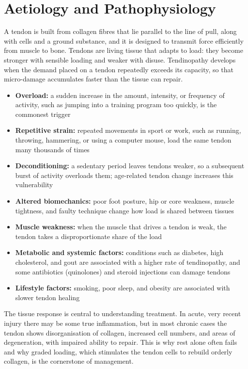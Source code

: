 \section*{Aetiology and Pathophysiology}
A tendon is built from collagen fibres that lie parallel to the line of pull, along with cells and a ground substance, and it is designed to transmit force efficiently from muscle to bone. Tendons are living tissue that adapts to load: they become stronger with sensible loading and weaker with disuse. Tendinopathy develops when the demand placed on a tendon repeatedly exceeds its capacity, so that micro-damage accumulates faster than the tissue can repair.

\begin{itemize}
    \item \textbf{Overload:} a sudden increase in the amount, intensity, or frequency of activity, such as jumping into a training program too quickly, is the commonest trigger
    \item \textbf{Repetitive strain:} repeated movements in sport or work, such as running, throwing, hammering, or using a computer mouse, load the same tendon many thousands of times
    \item \textbf{Deconditioning:} a sedentary period leaves tendons weaker, so a subsequent burst of activity overloads them; age-related tendon change increases this vulnerability
    \item \textbf{Altered biomechanics:} poor foot posture, hip or core weakness, muscle tightness, and faulty technique change how load is shared between tissues
    \item \textbf{Muscle weakness:} when the muscle that drives a tendon is weak, the tendon takes a disproportionate share of the load
    \item \textbf{Metabolic and systemic factors:} conditions such as diabetes, high cholesterol, and gout are associated with a higher rate of tendinopathy, and some antibiotics (quinolones) and steroid injections can damage tendons
    \item \textbf{Lifestyle factors:} smoking, poor sleep, and obesity are associated with slower tendon healing
\end{itemize}

The tissue response is central to understanding treatment. In acute, very recent injury there may be some true inflammation, but in most chronic cases the tendon shows disorganisation of collagen, increased cell numbers, and areas of degeneration, with impaired ability to repair. This is why rest alone often fails and why graded loading, which stimulates the tendon cells to rebuild orderly collagen, is the cornerstone of management.

